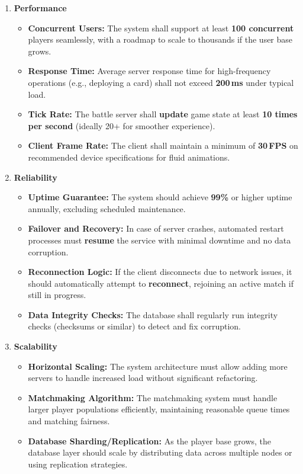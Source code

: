\documentclass{article}
\begin{document}
\begin{enumerate}[label=\textbf{NFR\arabic*.}]

\item \textbf{Performance}
\begin{itemize}
    \item \textbf{Concurrent Users:} The system shall support at least \textbf{100 concurrent} players seamlessly, with a roadmap to scale to thousands if the user base grows.
    \item \textbf{Response Time:} Average server response time for high-frequency operations (e.g., deploying a card) shall not exceed \textbf{200\,ms} under typical load.
    \item \textbf{Tick Rate:} The battle server shall \textbf{update} game state at least \textbf{10 times per second} (ideally 20+ for smoother experience).
    \item \textbf{Client Frame Rate:} The client shall maintain a minimum of \textbf{30\,FPS} on recommended device specifications for fluid animations.
\end{itemize}

\item \textbf{Reliability}
\begin{itemize}
    \item \textbf{Uptime Guarantee:} The system should achieve \textbf{99\%} or higher uptime annually, excluding scheduled maintenance.
    \item \textbf{Failover and Recovery:} In case of server crashes, automated restart processes must \textbf{resume} the service with minimal downtime and no data corruption.
    \item \textbf{Reconnection Logic:} If the client disconnects due to network issues, it should automatically attempt to \textbf{reconnect}, rejoining an active match if still in progress.
    \item \textbf{Data Integrity Checks:} The database shall regularly run integrity checks (checksums or similar) to detect and fix corruption.
\end{itemize}

\item \textbf{Scalability}
\begin{itemize}
    \item \textbf{Horizontal Scaling:} The system architecture must allow adding more servers to handle increased load without significant refactoring.
    \item \textbf{Matchmaking Algorithm:} The matchmaking system must handle larger player populations efficiently, maintaining reasonable queue times and matching fairness.
    \item \textbf{Database Sharding/Replication:} As the player base grows, the database layer should scale by distributing data across multiple nodes or using replication strategies.
\end{itemize}


\end{enumerate}
\end{document}
